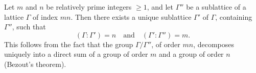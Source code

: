 Let $m$ and $n$ be relatively prime integers $\geq 1$, and let $\Gamma''$ be a sublattice of a lattice $\Gamma$ of index $mn$. Then there exists a unique sublattice $\Gamma'$ of $\Gamma$, containing $\Gamma''$, such that
$$(\Gamma:\Gamma') = n \quad \text{and} \quad (\Gamma':\Gamma'') = m.$$
This follows from the fact that the group $\Gamma/\Gamma''$, of order $mn$, decomposes uniquely into a direct sum of a group of order $m$ and a group of order $n$ (Bezout's theorem).

